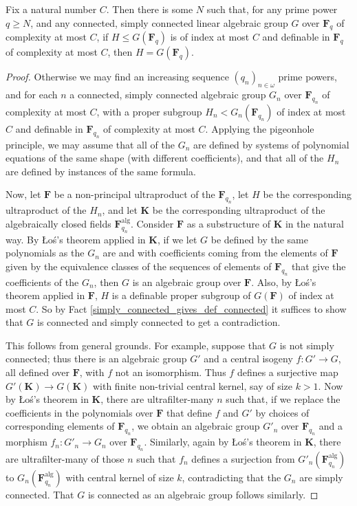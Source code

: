 \documentclass[10pt]{article}
\begin{document}
{\begin{lemma}\label{simply connected gives definably connected, finite case}
    Fix a natural number $C$. Then there is some $N$ such that, for any prime power $q\geqslant N$, and any connected, simply connected linear algebraic group $G$ over $\mathbf{F}_q$ of complexity at most $C$, if $H\leqslant G(\mathbf{F}_q)$ is of index at most $C$ and definable in $\mathbf{F}_q$ of complexity at most $C$, then $H=G(\mathbf{F}_q)$.
\end{lemma}
\begin{proof}
    Otherwise we may find an increasing sequence $(q_n)_{n\in\omega}$ prime powers, and for each $n$ a connected, simply connected algebraic group $G_n$ over $\mathbf{F}_{q_n}$ of complexity at most $C$, with a proper subgroup $H_n< G_n(\mathbf{F}_{q_n})$ of index at most $C$ and definable in $\mathbf{F}_{q_n}$ of complexity at most $C$. Applying the pigeonhole principle, we may assume that all of the $G_n$ are defined by systems of polynomial equations of the same shape (with different coefficients), and that all of the $H_n$ are defined by instances of the same formula.

    Now, let $\mathbf{F}$ be a non-principal ultraproduct of the $\mathbf{F}_{q_n}$, let $H$ be the corresponding ultraproduct of the $H_n$, and let $\mathbf{K}$ be the corresponding ultraproduct of the algebraically closed fields $\mathbf{F}_{q_n}^{\mathrm{alg}}$. Consider $\mathbf{F}$ as a substructure of $\mathbf{K}$ in the natural way. By Łoś's theorem applied in $\mathbf{K}$, if we let $G$ be defined by the same polynomials as the $G_n$ are and with coefficients coming from the elements of $\mathbf{F}$ given by the equivalence classes of the sequences of elements of $\mathbf{F}_{q_n}$ that give the coefficients of the $G_n$, then $G$ is an algebraic group over $\mathbf{F}$. Also, by Łoś's theorem applied in $\mathbf{F}$, $H$ is a definable proper subgroup of $G(\mathbf{F})$ of index at most $C$. So by Fact \ref{simply_connected_gives_def_connected} it suffices to show that $G$ is connected and simply connected to get a contradiction.
    
    This follows from general grounds. For example, suppose that $G$ is not simply connected; thus there is an algebraic group $G'$ and a central isogeny $f:G'\to G$, all defined over $\mathbf{F}$, with $f$ not an isomorphism. Thus $f$ defines a surjective map $G'(\mathbf{K})\to G(\mathbf{K})$ with finite non-trivial central kernel, say of size $k>1$. Now by Łoś's theorem in $\mathbf{K}$, there are ultrafilter-many $n$ such that, if we replace the coefficients in the polynomials over $\mathbf{F}$ that define $f$ and $G'$ by choices of corresponding elements of $\mathbf{F}_{q_n}$, we obtain an algebraic group $G'_n$ over $\mathbf{F}_{q_n}$ and a morphism $f_n:G'_n\to G_n$ over $\mathbf{F}_{q_n}$. Similarly, again by Łoś's theorem in $\mathbf{K}$, there are ultrafilter-many of those $n$ such that $f_n$ defines a surjection from $G'_n(\mathbf{F}_{q_n}^{\mathrm{alg}})$ to $G_n(\mathbf{F}_{q_n}^{\mathrm{alg}})$ with central kernel of size $k$, contradicting that the $G_n$ are simply connected. That $G$ is connected as an algebraic group follows similarly.
\end{proof}

}
\end{document}
